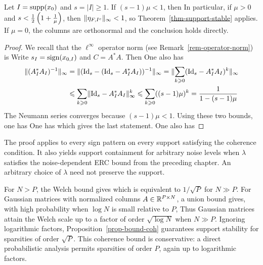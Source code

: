 \begin{prop}\label{prop-bound-coh}
	Let $I=\operatorname{supp}(x_0)$ and $s=|I|\geq1$. If $(s-1)\mu<1$, then
	In particular, if $\mu>0$ and $s < \frac{1}{2}\left( 1+\frac{1}{\mu} \right)$, then $\lVert\eta_{F,I^c}\rVert_\infty<1$, so Theorem~\ref{thm-support-stable} applies. If $\mu=0$, the columns are orthonormal and the conclusion holds directly.
\end{prop}
\begin{proof}
	We recall that the $\ell^\infty$ operator norm (see Remark~\ref{rem-operator-norm}) is
	Write $s_I=\operatorname{sign}(x_{0,I})$ and $C=A^*A$. Then
	One also has 
	\begin{align*}
		\lVert(A_I^*A_I)^{-1}\rVert_\infty &= \lVert(\mathrm{Id}_s-(\mathrm{Id}_s-A_I^*A_I))^{-1}\rVert_\infty
		= \lVert \sum_{k \geqslant 0} (\mathrm{Id}_s - A_I^*A_I)^k \rVert_\infty \\
		&\leqslant \sum_{k \geqslant 0} \lVert  \mathrm{Id}_s - A_I^*A_I \rVert_\infty^k \leqslant \sum_{k \geqslant 0} ((s-1) \mu)^k = \frac{1}{1 - (s-1)\mu}
	\end{align*}
    The Neumann series converges because $(s-1)\mu<1$.
	Using these two bounds, one has
	One has 
	which gives the last statement.
	One also has
\end{proof}

The proof applies to every sign pattern on every support satisfying the coherence condition. It also yields support containment for arbitrary noise levels when $\lambda$ satisfies the noise-dependent ERC bound from the preceding chapter. An arbitrary choice of $\lambda$ need not preserve the support.

For $N>P$, the Welch bound gives
which is equivalent to $1/\sqrt{P}$ for $N \gg P$.
%
For Gaussian matrices with normalized columns $A \in \mathbb{R}^{P \times N}$, a union bound gives, with high probability when $\log N$ is small relative to $P$,
Thus Gaussian matrices attain the Welch scale up to a factor of order $\sqrt{\log N}$ when $N\gg P$.
%
Ignoring logarithmic factors, Proposition~\ref{prop-bound-coh} guarantees support stability for sparsities of order $\sqrt P$. This coherence bound is conservative: a direct probabilistic analysis permits sparsities of order $P$, again up to logarithmic factors.

